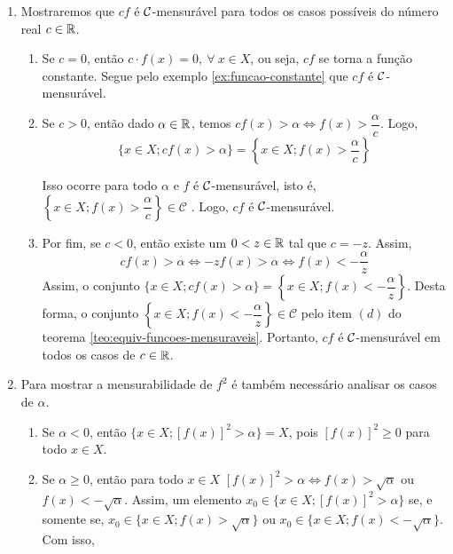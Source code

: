 \begin{prova}
    \begin{enumerate}[label*=(\alph*)]
        \item Mostraremos que $cf$ é $\operatorname{\mathcal{C}}$-mensurável para todos os casos possíveis do número real $c \in \mathbb{R}$.
            \begin{enumerate}[label=(\roman*)]
                \item Se $c = 0$, então $c\cdot f(x) = 0, \ \forall \ x \in X$, ou seja, $cf$ se torna a função constante. Segue pelo exemplo \ref{ex:funcao-constante} que $cf$ é $\operatorname{\mathcal{C}}$-mensurável.
                
                \item Se $c>0$, então  dado $\alpha \in \mathbb{R}$, temos $cf(x) > \alpha \Leftrightarrow f(x) >\dfrac{\alpha}{c}$. 
                Logo, 
                $$
                \{x \in X; cf(x) > \alpha\} 
                = 
                \left\{x \in X; f(x) > \dfrac{\alpha}{c}\right\}
                $$
                    
                Isso ocorre para todo $\alpha$ e $f$ é $\operatorname{\mathcal{C}}$-mensurável, isto é, $\left\{x \in X; f(x) > \dfrac{\alpha}{c}\right\} \in \mathcal{C}$  . Logo, $cf$ é $\operatorname{\mathcal{C}}$-mensurável.
                
                \item Por fim, se $c < 0$, então existe um $ 0 < z \in \mathbb{R}$ tal que $c = -z$.
                Assim, 
                $$cf(x) >\alpha \Leftrightarrow -zf(x) >\alpha \Leftrightarrow f(x) < -\dfrac{\alpha}{z}$$
                Assim, o conjunto $\{x \in X; cf(x) > \alpha \} = \left\{x \in X; f(x) < -\dfrac{\alpha}{z}\right\}$.
                Desta forma, o conjunto  $\left\{x \in X; f(x) < -\dfrac{\alpha}{z}\right\}  \in \mathcal{C}$ pelo  item $(d)$ do teorema \ref{teo:equiv-funcoes-mensuraveis}. Portanto,  $cf$ é $\operatorname{\mathcal{C}}$-mensurável em todos os casos de $c \in \mathbb{R}$.
            \end{enumerate}
            
        \item Para mostrar a mensurabilidade de $f^2$ é também necessário analisar os casos de $\alpha$.
            \begin{enumerate}[label = (\roman*)]
                \item Se $\alpha < 0$, então $\{x \in X; [f(x)]^2 > \alpha\} = X$, pois $[f(x)]^2 \geq 0$ para todo $x \in X$.
                
                \item Se $\alpha \geq 0$, então para todo $x \in X$ $[f(x)]^2 > \alpha \Leftrightarrow f(x) > \sqrt{\alpha}$ ou $f(x) < -\sqrt{\alpha}$.
                Assim, um elemento 
                $x_0 \in \{x \in X; [f(x)]^2 > \alpha\}$ se, e somente se, $x_0 \in \{x \in X; f(x)> \sqrt{\alpha}\}$ ou \linebreak $x_0 \in \{x \in X; f(x)< -\sqrt{\alpha}\}$.
                Com isso, 
                

\end{enumerate}
\end{enumerate}
\end{prova}
